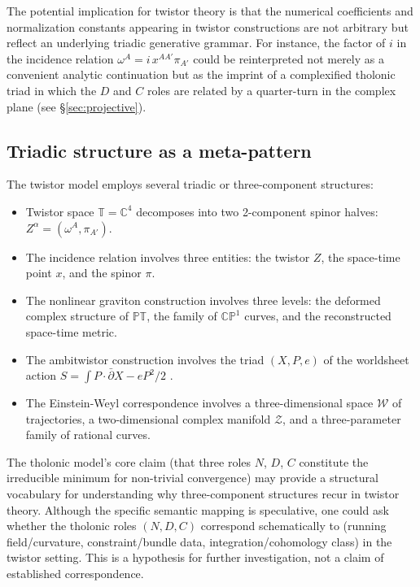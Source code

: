 \documentclass[12pt]{article}
\begin{document}
The potential implication for twistor theory is that the numerical coefficients and
normalization constants appearing in twistor constructions are not arbitrary but reflect
an underlying triadic generative grammar.  For instance, the factor of $i$ in the
incidence relation $\omega^A = i\,x^{AA'}\pi_{A'}$ could be reinterpreted not merely as
a convenient analytic continuation but as the imprint of a complexified tholonic triad
in which the $D$ and $C$ roles are related by a quarter-turn in the complex plane (see
\S\ref{sec:projective}).

\subsection{Triadic structure as a meta-pattern}\label{sec:meta-pattern}

The twistor model employs several triadic or three-component structures:
\begin{itemize}
  \item Twistor space $\mathbb{T} = \mathbb{C}^4$ decomposes into two 2-component spinor
        halves: $Z^\alpha = (\omega^A, \pi_{A'})$.
  \item The incidence relation involves three entities: the twistor $Z$, the space-time
        point $x$, and the spinor $\pi$.
  \item The nonlinear graviton construction involves three levels: the deformed complex
        structure of $\mathbb{PT}$, the family of $\mathbb{CP}^1$ curves, and the
        reconstructed space-time metric.
  \item The ambitwistor construction involves the triad $(X, P, e)$ of the worldsheet
        action $S = \int P \cdot \bar\partial X - eP^2/2$ \cite[Section~7c]{ADM17}.
  \item The Einstein-Weyl correspondence \cite[Theorem~6.1]{ADM17} involves a
        three-dimensional space $\mathcal{W}$ of trajectories, a two-dimensional complex
        manifold $\mathcal{Z}$, and a three-parameter family of rational curves.
\end{itemize}
The tholonic model's core claim (that three roles $N$, $D$, $C$ constitute the
irreducible minimum for non-trivial convergence) may provide a structural vocabulary for
understanding why three-component structures recur in twistor theory.  Although the
specific semantic mapping is speculative, one could ask whether the tholonic roles
$(N, D, C)$ correspond schematically to (running field/curvature, constraint/bundle
data, integration/cohomology class) in the twistor setting.  This is a hypothesis for
further investigation, not a claim of established correspondence.
\end{document}
